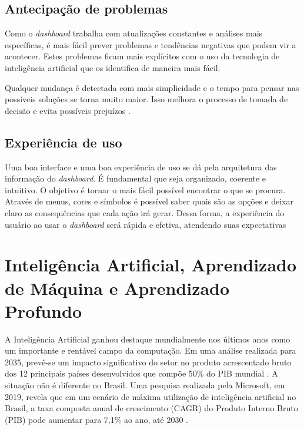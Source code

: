 \subsection{Antecipação de problemas}

\indent
\par Como o \textit{dashboard} trabalha com atualizações constantes e análises mais específicas, é mais fácil prever problemas e tendências negativas que podem vir a acontecer. Estes problemas ficam mais explícitos com o uso da tecnologia de inteligência artificial que os identifica de maneira mais fácil.

\par Qualquer mudança é detectada com mais simplicidade e o tempo para pensar nas possíveis soluções se torna muito maior. Isso melhora o processo de tomada de decisão e evita possíveis prejuízos \cite{Systemsat}.

\subsection{Experiência de uso}

\indent
\par Uma boa interface e uma boa experiência de uso se dá pela arquitetura das informação do \textit{dashboard}. É fundamental que seja organizado, coerente e intuitivo. O objetivo é tornar o mais fácil possível encontrar o que se procura. Através de menus, cores e  símbolos é possível saber quais são as opções e deixar claro as consequências que cada ação irá gerar. Dessa forma, a experiência do usuário ao usar o \textit{dashboard} será rápida e efetiva, atendendo suas expectativas \cite{Hostinger}

\section{Inteligência Artificial, Aprendizado de Máquina e Aprendizado Profundo}

\indent
\par A Inteligência Artificial ganhou destaque mundialmente nos últimos anos como um importante e rentável campo da computação. Em uma análise realizada para 2035, prevê-se um impacto significativo do setor no produto acrescentado bruto dos 12 principais países desenvolvidos que compõe 50\% do PIB mundial \cite{Accenture2016}. A situação não é diferente no Brasil. Uma pesquisa realizada pela Microsoft, em 2019, revela que em um cenário de máxima utilização de inteligência artificial no Brasil, a taxa composta anual de crescimento (CAGR) do Produto Interno Bruto (PIB) pode aumentar para 7,1\% ao ano, até 2030 \cite{MicrosoftNewsCenterBrasil2019}.

